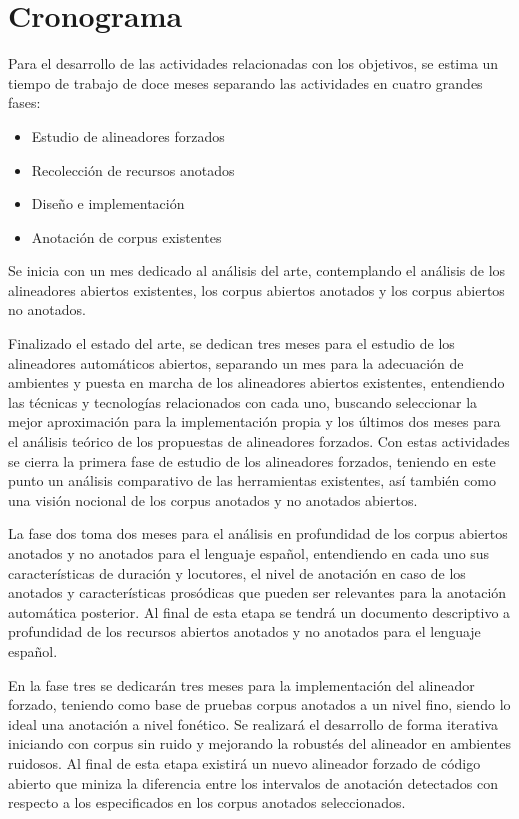 \chapter{Cronograma}

Para el desarrollo de las actividades relacionadas con los objetivos, se estima un tiempo de trabajo de doce meses separando las actividades en cuatro grandes fases:

\begin{itemize}
    \item Estudio de alineadores forzados 
    \item Recolección de recursos anotados
    \item Diseño e implementación 
    \item Anotación de corpus existentes
\end{itemize}

Se inicia con un mes dedicado al análisis del arte, contemplando el análisis de los alineadores abiertos existentes, los corpus abiertos anotados y los corpus abiertos no anotados.

Finalizado el estado del arte, se dedican tres meses para el estudio de los alineadores automáticos abiertos, separando un mes para la adecuación de ambientes y puesta en marcha de los alineadores abiertos existentes, entendiendo las técnicas y tecnologías relacionados con cada uno, buscando seleccionar la mejor aproximación para la implementación propia y los últimos dos meses para el análisis teórico de los propuestas de alineadores forzados. Con estas actividades se cierra la primera fase de estudio de los alineadores forzados, teniendo en este punto un análisis comparativo de las herramientas existentes, así también como una visión nocional de los corpus anotados y no anotados abiertos.

La fase dos toma dos meses para el análisis en profundidad de los corpus abiertos anotados y no anotados para el lenguaje español, entendiendo en cada uno sus características de duración y locutores, el nivel de anotación en caso de los anotados y características prosódicas que pueden ser relevantes para la anotación automática posterior. Al final de esta etapa se tendrá un documento descriptivo a profundidad de los recursos abiertos anotados y no anotados para el lenguaje español.

En la fase tres se dedicarán tres meses para la implementación del alineador forzado, teniendo como base de pruebas corpus anotados a un nivel fino, siendo lo ideal una anotación a nivel fonético. Se realizará el desarrollo de forma iterativa iniciando con corpus sin ruido y mejorando la robustés del alineador en ambientes ruidosos. Al final de esta etapa existirá un nuevo alineador forzado de código abierto que miniza la diferencia entre los intervalos de anotación detectados con respecto a los especificados en los corpus anotados seleccionados.

